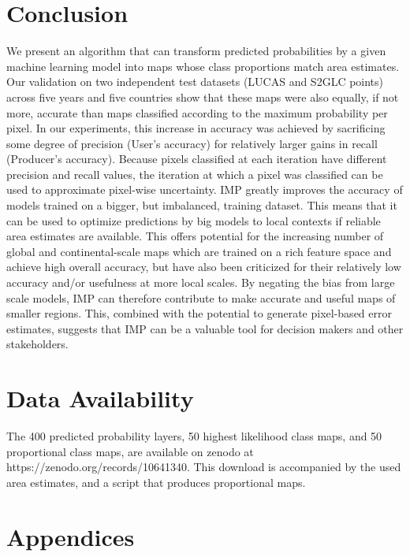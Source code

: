 \section{Conclusion}

    We present an algorithm that can transform predicted probabilities by a given machine learning model into maps whose class proportions match area estimates. Our validation on two independent test datasets (LUCAS and S2GLC points) across five years and five countries show that these maps were also equally, if not more, accurate than maps classified according to the maximum probability per pixel. In our experiments, this increase in accuracy was achieved by sacrificing some degree of precision (User's accuracy) for relatively larger gains in recall (Producer's accuracy). Because pixels classified at each iteration have different precision and recall values, the iteration at which a pixel was classified can be used to approximate pixel-wise uncertainty. 
    IMP greatly improves the accuracy of models trained on a bigger, but imbalanced, training dataset. This means that it can be used to optimize predictions by big models to local contexts if reliable area estimates are available. This offers potential for the increasing number of global and continental-scale maps which are trained on a rich feature space and achieve high overall accuracy, but have also been criticized for their relatively low accuracy and/or usefulness at more local scales. By negating the bias from large scale models, IMP can therefore contribute to make accurate and useful maps of smaller regions. This, combined with the potential to generate pixel-based error estimates, suggests that IMP can be a valuable tool for decision makers and other stakeholders.

\section{Data Availability}
The 400 predicted probability layers, 50 highest likelihood class maps, and 50 proportional class maps, are available on zenodo at https://zenodo.org/records/10641340. This download is accompanied by the used area estimates, and a script that produces proportional maps.

\section{Appendices}

